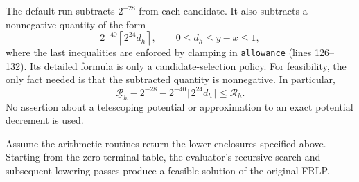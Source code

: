 The default run subtracts $2^{-28}$ from each candidate.
It also subtracts a nonnegative quantity of the form
\[
  2^{-40}\left\lceil 2^{24}d_h\right\rceil,
  \qquad 0\le d_h\le y-x\le1,
\]
where the last inequalities are enforced by clamping in
\texttt{allowance} (lines 126--132).  Its detailed formula is only a
candidate-selection policy.  For feasibility, the only fact needed is
that the subtracted quantity is nonnegative.  In particular,
\[
 \underline{\mathcal R}_h-2^{-28}-2^{-40}\lceil 2^{24}d_h\rceil\le\mathcal R_h.
\]
No assertion about a telescoping potential or approximation to an exact
potential decrement is used.

\begin{theorem}
\label{thm:cert-iid-backward}
Assume the arithmetic routines return the lower enclosures specified
above.  Starting from the zero terminal table, the evaluator's recursive
search and subsequent lowering passes produce a feasible solution of
the original FRLP.
\end{theorem}
